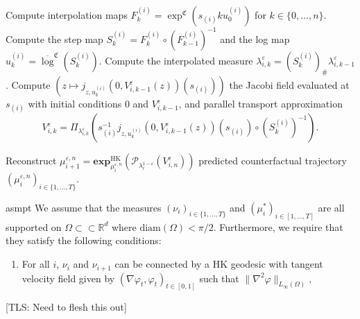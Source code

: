 \documentclass[11pt]{article}
\newcommand{\tls}[1]{{\color{cyan}[TLS: #1]}}
\begin{document}
\begin{algorithm}[H]
\begin{algorithmic}[1]
            \State Compute interpolation maps $F_k^{(i)} = \exp^{\mathfrak{C}}(s_{(i)}ku_0^{(i)})$ for $k \in \{0, \dots, n\}$.
                \State Compute the step map $S_k^{(i)} = F_k^{(i)} \circ (F_{k-1}^{(i)})^{-1}$ and the log map $u_k^{(i)} = \overline{\log}^{\mathfrak{C}}(S_k^{(i)})$.
                \State Compute the interpolated measure $\lambda_{i, k}^{\varepsilon} = (S_{k}^{(i)})_\# \lambda_{i, k-1}^{\varepsilon}$.
                \State Compute $\left(z \mapsto j_{z, u_k^{(i)}}(0, V_{i, k-1}^\varepsilon(z))(s_{(i)})\right)$ the Jacobi field evaluated at $s_{(i)}$ with initial \hspace*{\algorithmicindent}\hspace*{\algorithmicindent}conditions $0$ and $V^\varepsilon_{i, k-1}$, and parallel transport approximation
                \[V_{i, k}^\varepsilon = \Pi_{\lambda_{i, k}^\varepsilon}\left(s_{(i)}^{-1}j_{z, u_k^{(i)}}(0, V_{i, k-1}^\varepsilon(z))(s_{(i)}) \circ (S_k^{(i)})^{-1}\right).\]
                
            \EndFor
            \State Reconstruct $\mu_{i + 1}^{\varepsilon, n} = \mathbf{exp}_{\mu_i^{\varepsilon, n}}^{\text{HK}}(\mathcal{P}_{\lambda_i^{1-\varepsilon}}(V_{i, n}^\varepsilon))$
        \EndFor
    \State \Return predicted counterfactual trajectory $(\mu_i^{\varepsilon, n})_{i \in \{1, \dots, T\}}$.
    \end{algorithmic}
\end{algorithm} 

\begin{restatable}{asmpt}{} \label{all necessary HK assumptions}
    We assume that the measures $(\nu_i)_{i \in \{1, \dots, T\}}$ and $(\mu_i^*)_{i \in [1, \dots, T]}$ are all supported on $\Omega \subset \subset \mathbb{R}^d$ where $\text{diam}(\Omega) < \pi/2$. Furthermore, we require that they satisfy the following conditions:
    \begin{enumerate}
        \item For all $i$, $\nu_{i}$ and $\nu_{i+1}$ can be connected by a HK geodesic with tangent velocity field given by $(\nabla\varphi_t, \varphi_t)_{t \in [0, 1]}$ such that $\|\nabla^2\varphi\|_{L_\infty(\Omega)}, $
    \end{enumerate}
    \tls{Need to flesh this out}
\end{restatable}
\end{document}
